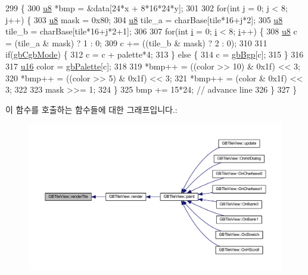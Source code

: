 \begin{DoxyCode}
299 \{
300   \mbox{\hyperlink{_system_8h_aed742c436da53c1080638ce6ef7d13de}{u8}} *bmp = &data[24*x + 8*16*24*y];
301 
302   \textcolor{keywordflow}{for}(\textcolor{keywordtype}{int} j = 0; j < 8; j++) \{
303     \mbox{\hyperlink{_system_8h_aed742c436da53c1080638ce6ef7d13de}{u8}} mask = 0x80;
304     \mbox{\hyperlink{_system_8h_aed742c436da53c1080638ce6ef7d13de}{u8}} tile\_a = charBase[tile*16+j*2];
305     \mbox{\hyperlink{_system_8h_aed742c436da53c1080638ce6ef7d13de}{u8}} tile\_b = charBase[tile*16+j*2+1];
306     
307     \textcolor{keywordflow}{for}(\textcolor{keywordtype}{int} \mbox{\hyperlink{expr-lex_8cpp_acb559820d9ca11295b4500f179ef6392}{i}} = 0; \mbox{\hyperlink{expr-lex_8cpp_acb559820d9ca11295b4500f179ef6392}{i}} < 8; \mbox{\hyperlink{expr-lex_8cpp_acb559820d9ca11295b4500f179ef6392}{i}}++) \{
308       \mbox{\hyperlink{_system_8h_aed742c436da53c1080638ce6ef7d13de}{u8}} c = (tile\_a & mask) ? 1 : 0;
309       c += ((tile\_b & mask) ? 2 : 0);
310       
311       \textcolor{keywordflow}{if}(\mbox{\hyperlink{gb_globals_8cpp_aa3e3449c9ba4db2eeb687d6facfca761}{gbCgbMode}}) \{
312         c = c + palette*4;
313       \} \textcolor{keywordflow}{else} \{
314         c = \mbox{\hyperlink{gb_globals_8cpp_af4aecde48e53c8b3aa9c7241443e5ef7}{gbBgp}}[c];
315       \}
316 
317       \mbox{\hyperlink{_system_8h_a9e6c91d77e24643b888dbd1a1a590054}{u16}} color = \mbox{\hyperlink{gb_globals_8cpp_a7c46bfb4d71e64d27d5aec543ba85b9a}{gbPalette}}[c];
318 
319       *bmp++ = ((color >> 10) & 0x1f) << 3;
320       *bmp++ = ((color >> 5) & 0x1f) << 3;
321       *bmp++ = (color & 0x1f) << 3;
322 
323       mask >>= 1;
324     \}
325     bmp += 15*24; \textcolor{comment}{// advance line}
326   \}
327 \}
\end{DoxyCode}
이 함수를 호출하는 함수들에 대한 그래프입니다.\+:
\nopagebreak
\begin{figure}[H]
\begin{center}
\leavevmode
\includegraphics[width=350pt]{class_g_b_tile_view_ade04081b3b047c110f6ae5673c7154ee_icgraph}
\end{center}
\end{figure}
\mbox{\label{class_g_b_tile_view_ac61ccd982b57db14794e1f9febc67c16}} 
